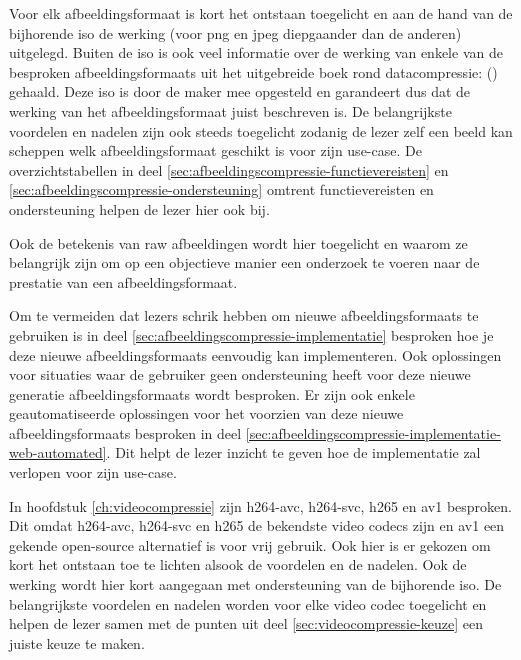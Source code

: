 Voor elk \gls{afbeeldingsformaat} is kort het ontstaan toegelicht en aan de hand van de bijhorende \gls{iso} de werking (voor \gls{png} en \gls{jpeg} diepgaander dan de anderen) uitgelegd. Buiten de \gls{iso} is ook veel informatie over de werking van enkele van de besproken \glspl{afbeeldingsformaat} uit het uitgebreide boek rond \gls{datacompressie}:  (\cite{Salomon2006}) gehaald. Deze \gls{iso} is door de maker mee opgesteld en garandeert dus dat de werking van het \gls{afbeeldingsformaat} juist beschreven is. De belangrijkste voordelen en nadelen zijn ook steeds toegelicht zodanig de lezer zelf een beeld kan scheppen welk \gls{afbeeldingsformaat} geschikt is voor zijn \gls{use-case}. De overzichtstabellen in deel \ref{sec:afbeeldingscompressie-functievereisten} en \ref{sec:afbeeldingscompressie-ondersteuning} omtrent functievereisten en ondersteuning helpen de lezer hier ook bij.

Ook de betekenis van \gls{raw} afbeeldingen wordt hier toegelicht en waarom ze belangrijk zijn om op een objectieve manier een onderzoek te voeren naar de prestatie van een \gls{afbeeldingsformaat}.

Om te vermeiden dat lezers schrik hebben om nieuwe \glspl{afbeeldingsformaat} te gebruiken is in deel \ref{sec:afbeeldingscompressie-implementatie} besproken hoe je deze nieuwe \glspl{afbeeldingsformaat} eenvoudig kan implementeren. Ook oplossingen voor situaties waar de gebruiker geen ondersteuning heeft voor deze nieuwe generatie \glspl{afbeeldingsformaat} wordt besproken. Er zijn ook enkele geautomatiseerde oplossingen voor het voorzien van deze nieuwe \glspl{afbeeldingsformaat} besproken in deel \ref{sec:afbeeldingscompressie-implementatie-web-automated}. Dit helpt de lezer inzicht te geven hoe de implementatie zal verlopen voor zijn \gls{use-case}.

In hoofdstuk \ref{ch:videocompressie} zijn \gls{h264-avc}, \gls{h264-svc}, \gls{h265} en \gls{av1} besproken. Dit omdat \gls{h264-avc}, \gls{h264-svc} en \gls{h265} de bekendste video \glspl{codec} zijn en \gls{av1} een gekende \gls{open-source} alternatief is voor vrij gebruik. Ook hier is er gekozen om kort het ontstaan toe te lichten alsook de voordelen en de nadelen. Ook de werking wordt hier kort aangegaan met ondersteuning van de bijhorende \gls{iso}. De belangrijkste voordelen en nadelen worden voor elke video \gls{codec} toegelicht en helpen de lezer samen met de punten uit deel \ref{sec:videocompressie-keuze} een juiste keuze te maken.

